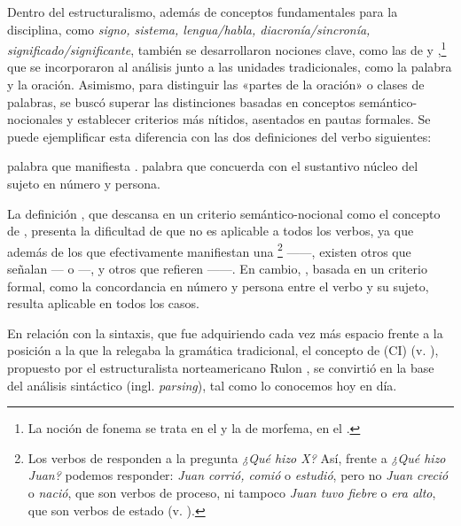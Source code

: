 Dentro del estructuralismo, además de conceptos fundamentales para la
disciplina, como \textit{signo, sistema, lengua/habla, diacronía/sincronía,
significado/significante}, también se desarrollaron nociones clave, como las de
 y ,\footnote{La noción de fonema se trata en
el  y la de morfema, en el .} que se incorporaron al
análisis junto a las unidades tradicionales, como la palabra y la oración.
Asimismo, para distinguir las «partes de la oración» o clases de palabras, se
buscó superar las distinciones basadas en conceptos semántico-nocionales y
establecer criterios más nítidos, asentados en pautas formales. Se puede
ejemplificar esta diferencia con las dos definiciones del verbo siguientes:

\begin{exe}
  \ex\label{ex:01-defverbo}
    \begin{xlist}
      \ex\label{ex:01-defverbo-a} palabra que manifiesta .
      \ex\label{ex:01-defverbo-b} palabra que concuerda con el sustantivo núcleo del sujeto en
          número y persona.
    \end{xlist}
\end{exe}

La definición , que descansa en un criterio
semántico-nocional como el concepto de , presenta la dificultad de
que no es aplicable a todos los verbos, ya que además de los que efectivamente
manifiestan una \footnote{\label{fn:01-accion}Los verbos de
 responden a la pregunta \textit{¿Qué hizo X?} Así, frente a
\textit{¿Qué hizo Juan?} podemos responder: \textit{Juan corrió, comió} o
\textit{estudió}, pero no \textit{Juan creció} o \textit{nació}, que son verbos
de proceso, ni tampoco \textit{Juan tuvo fiebre} o \textit{era alto}, que son
verbos de estado (v. ).} ------,
existen otros que señalan  --- o
---, y otros que refieren  ------. En cambio, , basada en un criterio formal,
como la concordancia en número y persona entre el verbo y su sujeto, resulta
aplicable en todos los casos.

En relación con la sintaxis, que fue adquiriendo cada vez más espacio frente a
la posición a la que la relegaba la gramática tradicional, el concepto de
 (CI) (v. ), propuesto por el
estructuralista norteamericano Rulon \textcite{wells1947}, se convirtió en la
base del análisis sintáctico (ingl. \textit{parsing}), tal como lo conocemos
hoy en día.

